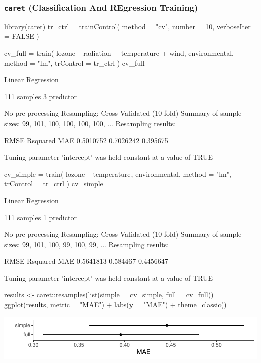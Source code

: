 \documentclass[a4paper]{article}
\begin{document}
\subsubsection{\lstinline|caret| (Classification And REgression Training)}
\begin{Schunk}
\begin{Sinput}
library(caret)
tr_ctrl = trainControl(
    method = "cv", number = 10,
    verboseIter = FALSE
  )

cv_full = train(
  lozone ~ radiation + temperature + wind, environmental,
  method = "lm",
  trControl = tr_ctrl
)
cv_full
\end{Sinput}
\begin{Soutput}
Linear Regression 

111 samples
  3 predictor

No pre-processing
Resampling: Cross-Validated (10 fold) 
Summary of sample sizes: 99, 101, 100, 100, 100, 100, ... 
Resampling results:

  RMSE       Rsquared   MAE     
  0.5010752  0.7026242  0.395675

Tuning parameter 'intercept' was held constant at a value of TRUE
\end{Soutput}
\begin{Sinput}
cv_simple = train(
  lozone ~ temperature, 
  environmental,
  method = "lm",
  trControl = tr_ctrl
)
cv_simple
\end{Sinput}
\begin{Soutput}
Linear Regression 

111 samples
  1 predictor

No pre-processing
Resampling: Cross-Validated (10 fold) 
Summary of sample sizes: 99, 101, 100, 99, 100, 99, ... 
Resampling results:

  RMSE       Rsquared  MAE      
  0.5641813  0.584467  0.4456647

Tuning parameter 'intercept' was held constant at a value of TRUE
\end{Soutput}
\begin{Sinput}
results <- caret::resamples(list(simple = cv_simple,  full = cv_full))
ggplot(results, metric = "MAE") +
  labs(y = "MAE") +
  theme_classic()
\end{Sinput}


{\centering \includegraphics[width=\maxwidth]{figure/listings-unnamed-chunk-407-1} 

}
\end{Schunk}
\end{document}
